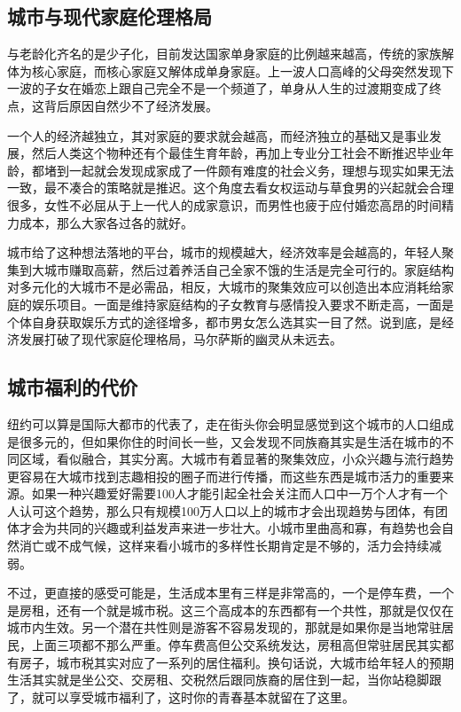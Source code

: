 \documentclass[]{book}
\begin{document}
\hypertarget{ux57ceux5e02ux4e0eux73b0ux4ee3ux5bb6ux5eadux4f26ux7406ux683cux5c40}{%
\subsection{城市与现代家庭伦理格局}\label{ux57ceux5e02ux4e0eux73b0ux4ee3ux5bb6ux5eadux4f26ux7406ux683cux5c40}}

与老龄化齐名的是少子化，目前发达国家单身家庭的比例越来越高，传统的家族解体为核心家庭，而核心家庭又解体成单身家庭。上一波人口高峰的父母突然发现下一波的子女在婚恋上跟自己完全不是一个频道了，单身从人生的过渡期变成了终点，这背后原因自然少不了经济发展。

一个人的经济越独立，其对家庭的要求就会越高，而经济独立的基础又是事业发展，然后人类这个物种还有个最佳生育年龄，再加上专业分工社会不断推迟毕业年龄，都堵到一起就会发现成家成了一件颇有难度的社会义务，理想与现实如果无法一致，最不凑合的策略就是推迟。这个角度去看女权运动与草食男的兴起就会合理很多，女性不必屈从于上一代人的成家意识，而男性也疲于应付婚恋高昂的时间精力成本，那么大家各过各的就好。

城市给了这种想法落地的平台，城市的规模越大，经济效率是会越高的，年轻人聚集到大城市赚取高薪，然后过着养活自己全家不饿的生活是完全可行的。家庭结构对多元化的大城市不是必需品，相反，大城市的聚集效应可以创造出本应消耗给家庭的娱乐项目。一面是维持家庭结构的子女教育与感情投入要求不断走高，一面是个体自身获取娱乐方式的途径增多，都市男女怎么选其实一目了然。说到底，是经济发展打破了现代家庭伦理格局，马尔萨斯的幽灵从未远去。

\hypertarget{ux57ceux5e02ux798fux5229ux7684ux4ee3ux4ef7}{%
\subsection{城市福利的代价}\label{ux57ceux5e02ux798fux5229ux7684ux4ee3ux4ef7}}

纽约可以算是国际大都市的代表了，走在街头你会明显感觉到这个城市的人口组成是很多元的，但如果你住的时间长一些，又会发现不同族裔其实是生活在城市的不同区域，看似融合，其实分离。大城市有着显著的聚集效应，小众兴趣与流行趋势更容易在大城市找到志趣相投的圈子而进行传播，而这些东西是城市活力的重要来源。如果一种兴趣爱好需要100人才能引起全社会关注而人口中一万个人才有一个人认可这个趋势，那么只有规模100万人口以上的城市才会出现趋势与团体，有团体才会为共同的兴趣或利益发声来进一步壮大。小城市里曲高和寡，有趋势也会自然消亡或不成气候，这样来看小城市的多样性长期肯定是不够的，活力会持续减弱。

不过，更直接的感受可能是，生活成本里有三样是非常高的，一个是停车费，一个是房租，还有一个就是城市税。这三个高成本的东西都有一个共性，那就是仅仅在城市内生效。另一个潜在共性则是游客不容易发现的，那就是如果你是当地常驻居民，上面三项都不那么严重。停车费高但公交系统发达，房租高但常驻居民其实都有房子，城市税其实对应了一系列的居住福利。换句话说，大城市给年轻人的预期生活其实就是坐公交、交房租、交税然后跟同族裔的居住到一起，当你站稳脚跟了，就可以享受城市福利了，这时你的青春基本就留在了这里。
\end{document}
